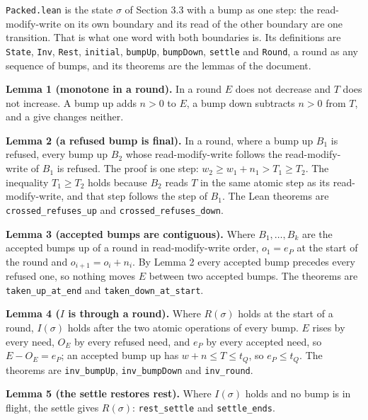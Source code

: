 \texttt{Packed.\allowbreak{}lean} is the state \(\sigma\) of Section 3.3 with a bump as one step: the read-modify-write on its own boundary and its read of the other boundary are one transition. That is what one word with both boundaries is. Its definitions are \texttt{State}, \texttt{Inv}, \texttt{Rest}, \texttt{initial}, \texttt{bump\allowbreak{}Up}, \texttt{bump\allowbreak{}Down}, \texttt{settle} and \texttt{Round}, a round as any sequence of bumps, and its theorems are the lemmas of the document.

\textbf{Lemma 1 (monotone in a round).} In a round \(E\) does not decrease and \(T\) does not increase. A bump up adds \(n > 0\) to \(E\), a bump down subtracts \(n > 0\) from \(T\), and a give changes neither.

\textbf{Lemma 2 (a refused bump is final).} In a round, where a bump up \(B_1\) is refused, every bump up \(B_2\) whose read-modify-write follows the read-modify-write of \(B_1\) is refused. The proof is one step: \(w_2 \ge w_1 + n_1 > T_1 \ge T_2\). The inequality \(T_1 \ge T_2\) holds because \(B_2\) reads \(T\) in the same atomic step as its read-modify-write, and that step follows the step of \(B_1\). The Lean theorems are \texttt{crossed\_\allowbreak{}refuses\_\allowbreak{}up} and \texttt{crossed\_\allowbreak{}refuses\_\allowbreak{}down}.

\textbf{Lemma 3 (accepted bumps are contiguous).} Where \(B_1, \dots, B_k\) are the accepted bumps up of a round in read-modify-write order, \(o_1 = e_P\) at the start of the round and \(o_{i+1} = o_i + n_i\). By Lemma 2 every accepted bump precedes every refused one, so nothing moves \(E\) between two accepted bumps. The theorems are \texttt{taken\_\allowbreak{}up\_\allowbreak{}at\_\allowbreak{}end} and \texttt{taken\_\allowbreak{}down\_\allowbreak{}at\_\allowbreak{}start}.

\textbf{Lemma 4 (\(I\) is through a round).} Where \(R(\sigma)\) holds at the start of a round, \(I(\sigma)\) holds after the two atomic operations of every bump. \(E\) rises by every need, \(O_E\) by every refused need, and \(e_P\) by every accepted need, so \(E - O_E = e_P\); an accepted bump up has \(w + n \le T \le t_Q\), so \(e_P \le t_Q\). The theorems are \texttt{inv\_\allowbreak{}bump\allowbreak{}Up}, \texttt{inv\_\allowbreak{}bump\allowbreak{}Down} and \texttt{inv\_\allowbreak{}round}.

\textbf{Lemma 5 (the settle restores rest).} Where \(I(\sigma)\) holds and no bump is in flight, the settle gives \(R(\sigma)\): \texttt{rest\_\allowbreak{}settle} and \texttt{settle\_\allowbreak{}ends}.

